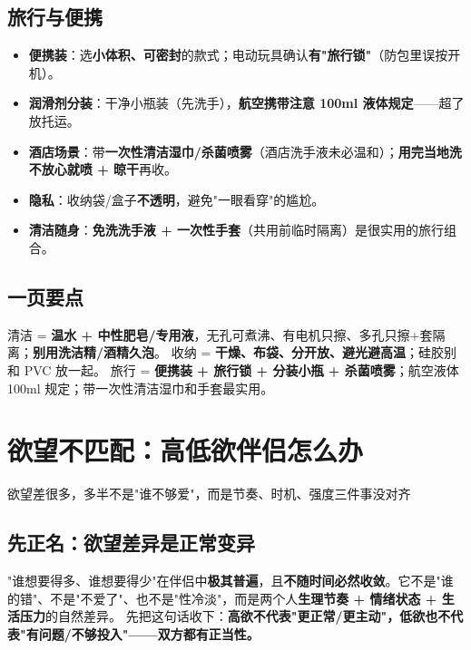 \documentclass[12pt,UTF8,openany]{ctexbook}
\begin{document}
\section{旅行与便携}
\begin{itemize}[leftmargin=2em,itemsep=0.3em]
  \item \textbf{便携装}：选\textbf{小体积、可密封}的款式；电动玩具确认\textbf{有"旅行锁"}（防包里误按开机）。
  \item \textbf{润滑剂分装}：干净小瓶装（先洗手），\textbf{航空携带注意 100ml 液体规定}——超了放托运。
  \item \textbf{酒店场景}：带\textbf{一次性清洁湿巾/杀菌喷雾}（酒店洗手液未必温和）；\textbf{用完当地洗不放心就喷 + 晾干}再收。
  \item \textbf{隐私}：收纳袋/盒子\textbf{不透明}，避免"一眼看穿"的尴尬。
  \item \textbf{清洁随身}：\textbf{免洗洗手液 + 一次性手套}（共用前临时隔离）是很实用的旅行组合。
\end{itemize}

\section{一页要点}
清洁 = \textbf{温水 + 中性肥皂/专用液}，无孔可煮沸、有电机只擦、多孔只擦+套隔离；\textbf{别用洗洁精/酒精久泡}。
收纳 = \textbf{干燥、布袋、分开放、避光避高温}；硅胶别和 PVC 放一起。
旅行 = \textbf{便携装 + 旅行锁 + 分装小瓶 + 杀菌喷雾}；航空液体 100ml 规定；带一次性清洁湿巾和手套最实用。


\chapter{欲望不匹配：高低欲伴侣怎么办}

\begin{center}
\myhei\large 欲望差很多，多半不是"谁不够爱"，而是节奏、时机、强度三件事没对齐
\end{center}

\section{先正名：欲望差异是正常变异}
"谁想要得多、谁想要得少"在伴侣中\textbf{极其普遍}，且\textbf{不随时间必然收敛}。它不是"谁的错"、不是"不爱了"、也不是"性冷淡"，而是两个人\textbf{生理节奏 + 情绪状态 + 生活压力}的自然差异。
先把这句话收下：\textbf{高欲不代表"更正常/更主动"，低欲也不代表"有问题/不够投入"——双方都有正当性。}
\end{document}
